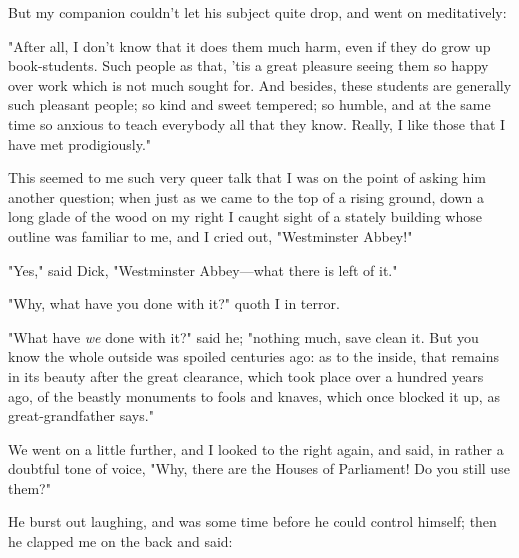 But my companion couldn't let his subject quite drop, and went on
meditatively:

"After all, I don't know that it does them much harm, even if they do
grow up book-students. Such people as that, 'tis a great pleasure seeing
them so happy over work which is not much sought for. And besides, these
students are generally such pleasant people; so kind and sweet tempered;
so humble, and at the same time so anxious to teach everybody all that
they know. Really, I like those that I have met prodigiously."

This seemed to me such very queer talk that I was on the point of asking
him another question; when just as we came to the top of a rising
ground, down a long glade of the wood on my right I caught sight of a
stately building whose outline was familiar to me, and I cried out,
"Westminster Abbey!"

"Yes," said Dick, "Westminster Abbey---what there is left of it."

"Why, what have you done with it?" quoth I in terror.

"What have \emph{we} done with it?" said he; "nothing much, save clean
it. But you know the whole outside was spoiled centuries ago: as to the
inside, that remains in its beauty after the great clearance, which took
place over a hundred years ago, of the beastly monuments to fools and
knaves, which once blocked it up, as great-grandfather says."

We went on a little further, and I looked to the right again, and said,
in rather a doubtful tone of voice, "Why, there are the Houses of
Parliament! Do you still use them?"

He burst out laughing, and was some time before he could control
himself; then he clapped me on the back and said:

